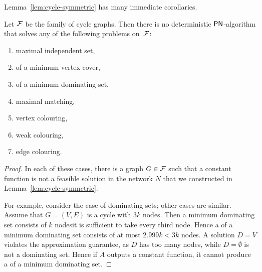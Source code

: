 Lemma~\ref{lem:cycle-symmetric} has many immediate corollaries.

\begin{corollary}\label{cor:cycle-symmetric}
    Let $\mathcal{F}$ be the family of cycle graphs. Then there is no deterministic $\textup{\sffamily PN}$-algorithm that solves any of the following problems on~$\mathcal{F}$:
    \begin{enumerate}[noitemsep]
        \item maximal independent set,
        \item {} of a minimum vertex cover,
        \item {} of a minimum dominating set,
        \item maximal matching,
        \item vertex colouring,
        \item weak colouring,
        \item edge colouring.
    \end{enumerate}
\end{corollary}
\begin{proof}
    In each of these cases, there is a graph $G \in \mathcal{F}$ such that a constant function is not a feasible solution in the network $N$ that we constructed in Lemma~\ref{lem:cycle-symmetric}.
    
    For example, consider the case of dominating sets; other cases are similar. Assume that $G = (V,E)$ is a cycle with $3k$ nodes. Then a minimum dominating set consists of $k$ nodes\mydash it is sufficient to take every third node. Hence a  of a minimum dominating set consists of at most $2.999k < 3k$ nodes. A solution $D = V$ violates the approximation guarantee, as $D$ has too many nodes, while $D = \emptyset$ is not a dominating set. Hence if $A$ outputs a constant function, it cannot produce a  of a minimum dominating set.
\end{proof}

